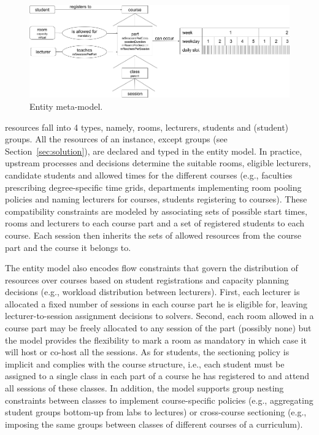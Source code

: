 \begin{figure}[ht]
\includegraphics[scale=0.35]{img/utp_entity_model.png}
\caption{Entity meta-model.}
\label{fig:utp-entity-model}
\end{figure}

{\UTP} resources fall into 4 types, namely, rooms, lecturers, students and (student) groups.
All the resources of an instance, except groups (see Section~\ref{sec:solution}), are declared and typed in the entity model. In practice, upstream processes and decisions %
determine the suitable rooms, eligible lecturers, candidate students and allowed times for the different courses (e.g., faculties prescribing degree-specific time grids, departments implementing room pooling policies and naming lecturers for courses, students registering to courses). %
These compatibility constraints are modeled by associating sets of possible start times, rooms and lecturers to each course part and a set of registered students to each course. Each session then inherits the sets of allowed resources from the course part and the course it belongs to.

The entity model also encodes flow constraints that govern the distribution of resources over courses based on student registrations and capacity planning decisions (e.g., workload distribution between lecturers). First, each lecturer is allocated a fixed number of sessions in each course part he is eligible for, leaving lecturer-to-session assignment decisions to solvers. Second, each room allowed in a course part may be freely allocated to any session of the part (possibly none) but the model provides the flexibility to mark a room as mandatory in which case it will host or co-host all the sessions. As for students, the sectioning policy is implicit and complies with the course structure, i.e., each student must be assigned to a single class in each part of a course he has registered to and attend all sessions of these classes. In addition, the model supports group nesting constraints between classes to implement course-specific policies (e.g., aggregating student groups bottom-up from labs to lectures) or cross-course sectioning (e.g., imposing the same groups between classes of different courses of a curriculum).
 
